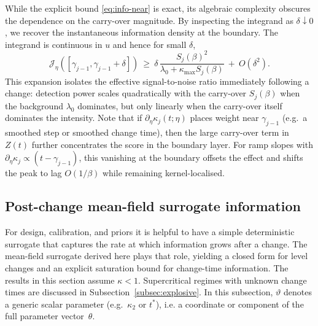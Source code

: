 \documentclass{article}
\theoremstyle{plain}
\theoremstyle{definition}
\newcommand{\1}{\mathbf{1}}
\begin{document}
    
     While the explicit bound \eqref{eq:info-near} is exact, its algebraic complexity obscures the dependence on the carry-over magnitude. By inspecting the integrand as $\delta \downarrow 0$, we recover the instantaneous information density at the boundary. The integrand is continuous in $u$ and hence for small $\delta$, 
    \begin{equation}
    \label{eq:info-short-delta}
    \mathcal J_\eta([\gamma_{j-1},\gamma_{j-1}+\delta])
    \ \ge\
    \delta\,\frac{S_j(\beta)^2}{\lambda_0+\kappa_{\max} S_j(\beta)}\ +\ O(\delta^2).
    \end{equation}
    This expansion isolates the effective signal-to-noise ratio immediately following a change: detection power scales quadratically with the carry-over $S_j(\beta)$ when the background $\lambda_0$ dominates, but only linearly when the carry-over itself dominates the intensity. Note that if $\partial_\eta\kappa_j(t;\eta)$  places weight near $\gamma_{j-1}$ (e.g.\ a smoothed step or smoothed change time), then the large carry-over term in $Z(t)$ further concentrates the score in the boundary layer. For ramp slopes with $\partial_\eta\kappa_j\propto (t-\gamma_{j-1})$, this vanishing at the boundary offsets the effect and shifts the peak to lag $O(1/\beta)$ while remaining kernel-localised.
    
    \subsection{Post-change mean-field surrogate information}
    \label{sec:mf-info}
    
    For design, calibration, and priors it is helpful to have a simple deterministic surrogate that captures the rate at which information grows after a change. The mean-field surrogate derived here plays that role, yielding a closed form for level changes and an explicit saturation bound for change-time information. The results in this section assume $\kappa<1$. Supercritical regimes with unknown change times are discussed in  Subsection~\ref{subsec:explosive}. In this subsection, $\vartheta$ denotes a generic scalar parameter (e.g.\ $\kappa_2$ or $t^\ast$), i.e. a coordinate or component of the full parameter vector~$\theta$.
\end{document}
